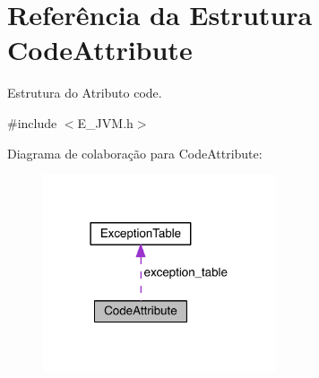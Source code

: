 \hypertarget{struct_code_attribute}{}\section{Referência da Estrutura Code\+Attribute}
\label{struct_code_attribute}


Estrutura do Atributo code.  




{\ttfamily \#include $<$E\+\_\+\+J\+V\+M.\+h$>$}



Diagrama de colaboração para Code\+Attribute\+:\nopagebreak
\begin{figure}[H]
\begin{center}
\leavevmode
\includegraphics[width=195pt]{struct_code_attribute__coll__graph}
\end{center}
\end{figure}
